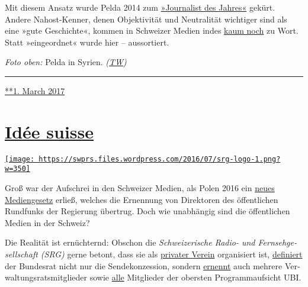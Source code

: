 Mit diesem Ansatz wurde Pelda 2014 zum
\href{http://www.srf.ch/news/panorama/kurt-pelda-ist-journalist-des-jahres}{»Jour­na­list
des Jahres«} gekürt. Andere Nahost-Ken­ner, denen Objek­ti­vi­tät und
Neutra­lität wich­ti­ger sind als eine »gute Ge­schichte«, kommen in
Schwei­zer Medien indes
\href{https://swprs.org/das-gewuenschte-narrativ-ii/}{kaum noch} zu
Wort. Statt »ein­ge­ordnet« wurde hier -- aus­sor­tiert.

\emph{Foto oben:} Pelda in Syrien.
\emph{(\href{https://tageswoche.ch/politik/ein-basler-im-syrischen-kampfgebiet/}{TW})}

\begin{center}\rule{0.5\linewidth}{\linethickness}\end{center}

\href{https://swprs.org/2017/03/01/der-kriegsreporter/}{**1. March 2017}

\hypertarget{iduxe9e-suisse}{%
\section{\texorpdfstring{\href{https://swprs.org/2017/03/01/srg-idee-suisse/}{Idée
suisse}}{Idée suisse}}\label{iduxe9e-suisse}}

\href{https://swprs.org/2017/03/01/srg-idee-suisse/}{\texttt{[image: https://swprs.files.wordpress.com/2016/07/srg-logo-1.png?w=350]}}

Groß war der Auf­schrei in den Schweizer Medien, als Polen 2016 ein
\href{http://www.nzz.ch/international/europa/wie-medien-zu-nationalen-kulturinstituten-werden-1.18670792}{neues
Medien­ge­setz} erließ, welches die Er­nennung von Di­rek­toren des
öffent­lichen Rundfunks der Regierung übertrug. Doch wie un­ab­hängig
sind die öffentlichen Medien in der Schweiz?

Die Realität ist er­nüch­ternd: Obschon die \emph{Schwei­ze­rische
Radio- und Fern­seh­ge­sell­schaft (SRG)} gerne betont, dass sie als
\href{https://web.archive.org/web/20190412225655/https://www.srginsider.ch/service-public/2013/10/30/warum-ist-der-ausdruck-staatsfernsehen-oder-oeffentlich-rechtlicher-sender-falsch/}{privater
Verein} orga­ni­siert ist,
\href{https://www.srgd.ch/de/aktuelles/news/2016/11/04/srg-konzession-weiterhin-den-handen-des-bundesrats/}{definiert}
der Bundesrat nicht nur die Sendekonzession, sondern
\href{http://www.srgssr.ch/de/srg/organe/verwaltungsrat/}{ernennt} auch
meh­rere Ver­wal­tungs­rats­mit­glieder sowie
\href{https://www.ubi.admin.ch/}{alle} Mit­glieder der obersten
Pro­gramm­auf­sicht UBI.

